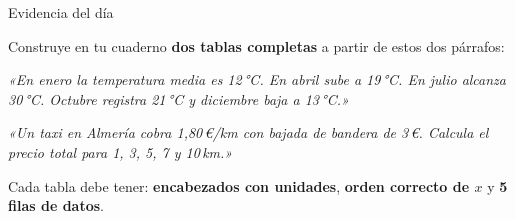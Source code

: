 \documentclass[aspectratio=169, 10pt, spanish]{beamer}
\begin{document}
\begin{frame}{Evidencia del día}
  \begin{evidenciabox}
    Construye en tu cuaderno \textbf{dos tablas completas}
    a partir de estos dos párrafos:

    \vspace{0.2cm}
    \begin{tcolorbox}[colback=AlmAmbar!10, colframe=AlmAmbar!60!black,
                      arc=3pt, boxrule=0.8pt, fonttitle=\bfseries\AlmFontSmall,
                      title={Párrafo A — Temperaturas en Almería}]
      \AlmFontSmall\itshape
      «En enero la temperatura media es 12\,°C.
      En abril sube a 19\,°C. En julio alcanza 30\,°C.
      Octubre registra 21\,°C y diciembre baja a 13\,°C.»
    \end{tcolorbox}

    \vspace{0.2cm}
    \begin{tcolorbox}[colback=AlmAzulC!10, colframe=AlmAzulC!70!black,
                      arc=3pt, boxrule=0.8pt, fonttitle=\bfseries\AlmFontSmall,
                      title={Párrafo B — Precio del taxi}]
      \AlmFontSmall\itshape
      «Un taxi en Almería cobra 1{,}80\,€/km con bajada de bandera de 3\,€.
      Calcula el precio total para 1, 3, 5, 7 y 10\,km.»
    \end{tcolorbox}

    \vspace{0.2cm}
    \AlmFontSmall
    Cada tabla debe tener: \textbf{encabezados con unidades},
    \textbf{orden correcto de \(x\)} y \textbf{5 filas de datos}.
  \end{evidenciabox}
\end{frame}
\end{document}
